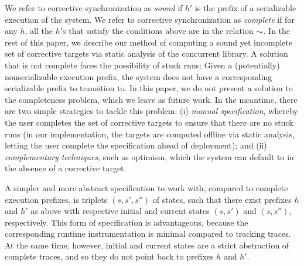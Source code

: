 We refer to corrective synchronization as \emph{sound} if $h'$ is the prefix of a serializable execution of the system. We refer to corrective synchronization as \emph{complete} if for any $h$, all the $h'$s that satisfy the conditions above are in the relation $\sim$. In the rest of this paper, we describe our method of computing a sound yet incomplete set of corrective targets via static analysis of the concurrent library.
%
A solution that is not complete faces the possibility of stuck runs: Given a (potentially) nonserializable execution prefix, the system does not have a corresponding serializable prefix to transition to. In this paper, we do not present a solution to the completeness problem, which we leave as future work. In the meantime, there are two simple strategies to tackle this problem: (i) \emph{manual specification}, whereby the user completes the set of corrective targets to ensure that there are no stuck runs (in our implementation, the targets are computed offline via static analysis, letting the user complete the specification ahead of deployment); and (ii) \emph{complementary techniques}, such as optimism, which the system can default to in the absence of a corrective target.


%
A simpler and more abstract specification to work with, compared to complete execution prefixes, is triplets $(s,s',s'')$ of states, such that there exist prefixes $h$ and $h'$ as above with respective initial and current states $(s,s')$ and $(s,s'')$, respectively. This form of specification is advantageous, because the corresponding runtime instrumentation is minimal compared to tracking traces. At the same time, however, initial and current states are a strict abstraction of complete traces, and so they do not 
point back to prefixes $h$ and $h'$.

